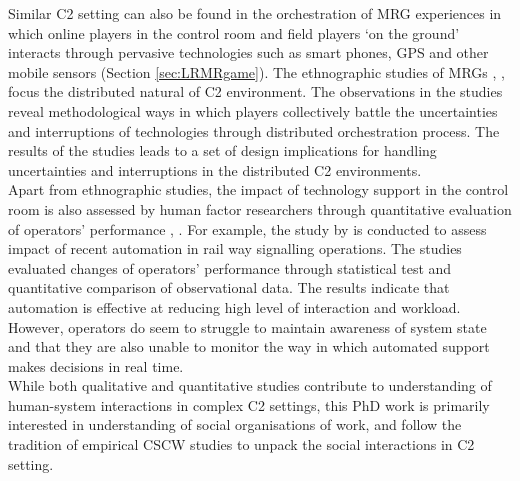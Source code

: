 Similar \ac{C2} setting can also be found in the orchestration of \acf{MRG} experiences in which online players in the control room and field players `on the ground' interacts through pervasive technologies such as smart phones, GPS and other mobile sensors (Section \ref{sec:LRMRgame}). The ethnographic studies of MRGs \cite{Benford2006}, \cite{Crabtree2004}, \cite{Koleva2001} focus the distributed natural of \ac{C2} environment. The observations in the studies reveal methodological ways in which players collectively battle the uncertainties and interruptions of technologies through distributed orchestration process. The results of the studies leads to a set of design implications for handling uncertainties and interruptions in the distributed \ac{C2} environments. \\

Apart from ethnographic studies, the impact of technology support in the control room is also assessed by human factor researchers through quantitative evaluation of operators' performance \cite{Grootjen2007}, \cite{Sharples2011}. For example, the study by \cite{Sharples2011} is conducted to assess impact of recent automation in rail way signalling operations. The studies evaluated changes of operators' performance through statistical test and quantitative comparison of observational data. The results indicate that automation is effective at reducing high level of interaction and workload. However, operators do seem to struggle to maintain awareness of system state and that they are also unable to monitor the way in which automated support makes decisions in real time. \\

While both qualitative and quantitative studies contribute to understanding of human-system interactions in complex \ac{C2} settings, this PhD work is primarily interested in understanding of social organisations of work, and follow the tradition of empirical \ac{CSCW} studies to unpack the social interactions in \ac{C2} setting. \\




